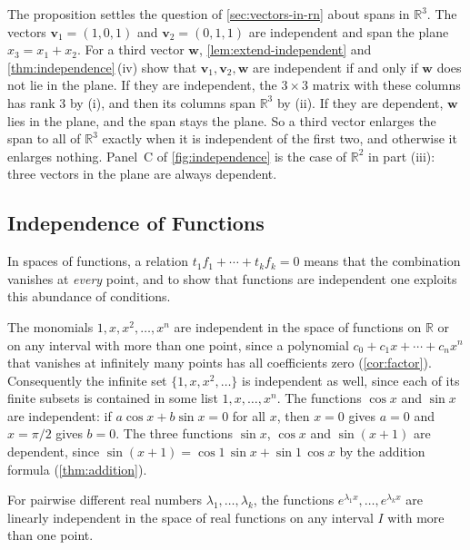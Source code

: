 The proposition settles the question of \cref{sec:vectors-in-rn} about spans in $\mathbb R^3$. The vectors $\mathbf v_1=(1,0,1)$ and $\mathbf v_2=(0,1,1)$ are independent and span the plane $x_3=x_1+x_2$. For a third vector $\mathbf w$, \cref{lem:extend-independent} and \cref{thm:independence}\,(iv) show that $\mathbf v_1,\mathbf v_2,\mathbf w$ are independent if and only if $\mathbf w$ does not lie in the plane. If they are independent, the $3\times3$ matrix with these columns has rank $3$ by (i), and then its columns span $\mathbb R^3$ by (ii). If they are dependent, $\mathbf w$ lies in the plane, and the span stays the plane. So a third vector enlarges the span to all of $\mathbb R^3$ exactly when it is independent of the first two, and otherwise it enlarges nothing. Panel~C of \cref{fig:independence} is the case of $\mathbb R^2$ in part (iii): three vectors in the plane are always dependent.

\subsection{Independence of Functions}

In spaces of functions, a relation $t_1f_1+\cdots+t_kf_k=0$ means that the combination vanishes at \emph{every} point, and to show that functions are independent one exploits this abundance of conditions.

The monomials $1,x,x^2,\ldots,x^n$ are independent in the space of functions on $\mathbb R$ or on any interval with more than one point, since a polynomial $c_0+c_1x+\cdots+c_nx^n$ that vanishes at infinitely many points has all coefficients zero (\cref{cor:factor}). Consequently the infinite set $\{1,x,x^2,\ldots\}$ is independent as well, since each of its finite subsets is contained in some list $1,x,\ldots,x^n$. The functions $\cos x$ and $\sin x$ are independent: if $a\cos x+b\sin x=0$ for all $x$, then $x=0$ gives $a=0$ and $x=\pi/2$ gives $b=0$. The three functions $\sin x$, $\cos x$ and $\sin(x+1)$ are dependent, since $\sin(x+1)=\cos1\,\sin x+\sin1\,\cos x$ by the addition formula (\cref{thm:addition}).

\begin{proposition}
\label{prop:exponentials-independent}
For pairwise different real numbers $\lambda_1,\ldots,\lambda_k$, the functions $e^{\lambda_1x},\ldots,e^{\lambda_kx}$ are linearly independent in the space of real functions on any interval $I$ with more than one point.
\end{proposition}

